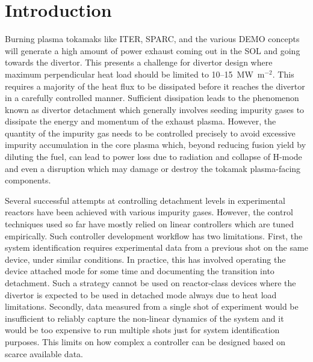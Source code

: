 
\section{Introduction}
\label{sec:introduction}

Burning plasma tokamaks like ITER\cite{holtkap_2007_fed}, SPARC\cite{Creely_2020}, and the various DEMO concepts will generate a high amount of power exhaust coming out in the \ac{SOL} and going towards the divertor. This presents a challenge for divertor design where maximum perpendicular heat load should be limited to 10--15~MW~$\mathrm{m}^{-2}$\cite{pitts_2019_nme}. This requires a majority of the heat flux to be dissipated before it reaches the divertor in a carefully controlled manner. Sufficient dissipation leads to the phenomenon known as divertor detachment which generally involves seeding impurity gases to dissipate the energy and momentum of the exhaust plasma. However, the quantity of the impurity gas needs to be controlled precisely to avoid excessive impurity accumulation in the core plasma\cite{eldon_2023_nme} which, beyond reducing fusion yield by diluting the fuel, can lead to power loss due to radiation and collapse of H-mode and even a disruption which may damage or destroy the tokamak plasma-facing components. 


Several successful attempts at controlling detachment levels in experimental reactors have been achieved with various impurity gases\cite{kallenbach_2012_nf,ravensbergen_2021_nc, eldon_2022_ppcf}. However, the control techniques used so far have mostly relied on linear controllers which are tuned empirically. Such controller development workflow has two limitations. First, the system identification requires experimental data from a previous shot on the same device, under similar conditions. In practice, this has involved operating the device attached mode for some time and documenting the transition into detachment. Such a strategy cannot be used on reactor-class devices where the divertor is expected to be used in detached mode always due to heat load limitations. Secondly, data measured from a single shot of experiment would be insufficient to reliably capture the non-linear dynamics of the system and it would be too expensive to run multiple shots just for system identification purposes. This limits on how complex a controller can be designed based on scarce available data.

